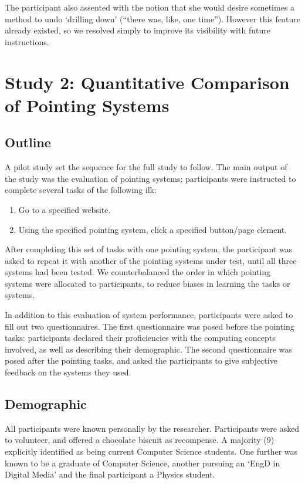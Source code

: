 \documentclass[11pt,openright,a4paper]{report}
\begin{document}
The participant also assented with the notion that she would desire sometimes a method to undo `drilling down' (``there was, like, one time''). However this feature already existed, so we resolved simply to improve its visibility with future instructions.

\section{Study 2: Quantitative Comparison of Pointing Systems}
\subsection{Outline}
A pilot study set the sequence for the full study to follow. The main output of the study was the evaluation of pointing systems; participants were instructed to complete several tasks of the following ilk:
\begin{enumerate}
\item Go to a specified website.
\item Using the specified pointing system, click a specified button/page element.
\end{enumerate}
After completing this set of tasks with one pointing system, the participant was asked to repeat it with another of the pointing systems under test, until all three systems had been tested. We counterbalanced the order in which pointing systems were allocated to participants, to reduce biases in learning the tasks or systems.

In addition to this evaluation of system performance, participants were asked to fill out two questionnaires. The first questionnaire was posed before the pointing tasks: participants declared their proficiencies with the computing concepts involved, as well as describing their demographic. The second questionnaire was posed after the pointing tasks, and asked the participants to give subjective feedback on the systems they used.

\subsection{Demographic}
All participants were known personally by the researcher. Participants were asked to volunteer, and offered a chocolate biscuit as recompense. A majority (9) explicitly identified as being current Computer Science students. One further was known to be a graduate of Computer Science, another pursuing an `EngD in Digital Media' and the final participant a Physics student.
\end{document}
